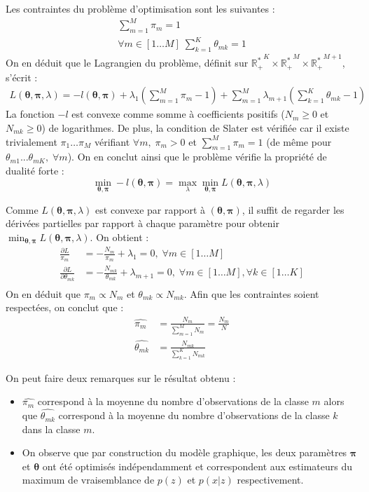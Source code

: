 \documentclass{article}
\begin{document}
Les contraintes du problème d'optimisation sont les suivantes :
\begin{align*}
\sum_{m=1}^M \pi_m = 1 \\
\forall m\in [1\ldots M]\; \sum_{k=1}^K \theta_{mk} = 1
\end{align*}
%
On en déduit que le Lagrangien du problème, définit sur ${\mathbb{R}^*_+}^K \times {\mathbb{R}^*_+}^M \times {\mathbb{R}^*_+}^{M+1}$, s'écrit :
\begin{align*}
L(\mathbf{\theta}, \mathbf{\pi}, \lambda) = -l(\mathbf{\theta}, \mathbf{\pi}) + \lambda_1 \left( \sum_{m=1}^M \pi_m - 1 \right) + \sum_{m=1}^M \lambda_{m+1} \left( \sum_{k=1}^K \theta_{mk} - 1 \right)
\end{align*}
%
La fonction $-l$ est convexe comme somme à coefficients positifs ($N_m \geq 0$ et $N_{mk} \geq 0$) de logarithmes. De plus, la condition de Slater est vérifiée car il existe trivialement $\pi_1 \ldots \pi_M$ vérifiant $\forall m,\; \pi_m > 0$ et $\sum_{m=1}^M \pi_m = 1$ (de même pour $\theta_{m1}...\theta_{mK},\; \forall m$). On en conclut ainsi que le problème vérifie la propriété de dualité forte :
$$
\min_{\mathbf{\theta}, \mathbf{\pi}} -l(\mathbf{\theta}, \mathbf{\pi}) = \max_\lambda \min_{\mathbf{\theta}, \mathbf{\pi}} L(\mathbf{\theta}, \mathbf{\pi}, \lambda)
$$

Comme $L(\mathbf{\theta}, \mathbf{\pi}, \lambda)$ est convexe par rapport à $(\mathbf{\theta},\mathbf{\pi})$, il suffit de regarder les dérivées partielles par rapport à chaque paramètre pour obtenir $\min_{\mathbf{\theta}, \mathbf{\pi}} L(\mathbf{\theta}, \mathbf{\pi}, \lambda)$. On obtient :
\begin{align*}
\frac{\partial L}{\pi_m} &= -\frac{N_m}{\pi_m} + \lambda_1 = 0, \; \forall m\in [1\ldots M]\\
\frac{\partial L}{\partial \theta_{mk}} &= -\frac{N_{mk}}{\theta_{mk}} +\lambda_{m+1} = 0, \; \forall m\in [1\ldots M], \forall k\in [1\ldots K]\\
\end{align*}
On en déduit que $\pi_m  \propto N_m$ et $\theta_{mk} \propto N_{mk}$. Afin que les contraintes soient respectées, on conclut que :
\begin{align*}
\hat{\pi_m} &= \frac{N_m}{\sum_{m=1}^M N_m} = \frac{N_m}{N}\\
\hat{\theta_{mk}} &= \frac{N_{mk}}{\sum_{k=1}^K N_{mk}}
\end{align*}

On peut faire deux remarques sur le résultat obtenu :
\begin{itemize}
\item $\hat{\pi_m}$ correspond à la moyenne du nombre d'observations de la classe $m$ alors que $\hat{\theta_{mk}}$ correspond à la moyenne du nombre d'observations de la classe $k$ dans la classe $m$.
\item On observe que par construction du modèle graphique, les deux paramètres $\mathbf{\pi}$ et $\mathbf{\theta}$ ont été optimisés indépendamment et correspondent aux estimateurs du maximum de vraisemblance de $p(z)$ et $p(x|z)$ respectivement.
\end{itemize}
\end{document}
